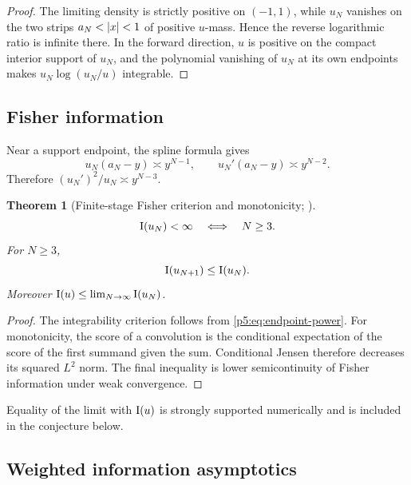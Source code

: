 \documentclass[11pt,oneside]{article}
\numberwithin{equation}{section}
\newtheorem{theorem}{Theorem}[section]
\theoremstyle{definition}
\theoremstyle{remark}
\begin{document}
\begin{proof}
The limiting density is strictly positive on $(-1,1)$, while $u_N$ vanishes on the two strips $a_N<\left\lvert x\right\rvert<1$ of positive $u$-mass.  Hence the reverse logarithmic ratio is infinite there.  In the forward direction, $u$ is positive on the compact interior support of $u_N$, and the polynomial vanishing of $u_N$ at its own endpoints makes $u_N\log(u_N/u)$ integrable.
\end{proof}

\subsection{Fisher information}

Near a support endpoint, the spline formula gives
\begin{equation}
 u_N(a_N-y)\asymp y^{N-1},
 \qquad
 u_N'(a_N-y)\asymp y^{N-2}.
 \label{p5:eq:endpoint-power}
\end{equation}
Therefore $(u_N')^2/u_N\asymp y^{N-3}$.

\begin{theorem}[Finite-stage Fisher criterion and monotonicity; \newresult]
\begin{equation}
 \operatorname{I}(u_N)<\infty\quad\Longleftrightarrow\quad N\ge3.
 \label{p5:eq:fisher-criterion}
\end{equation}
For $N\ge3$,
\begin{equation}
 \operatorname{I}(u_{N+1})\le\operatorname{I}(u_N).
 \label{p5:eq:fisher-monotone}
\end{equation}
Moreover $\operatorname{I}(u)\le\lim_{N\to\infty}\operatorname{I}(u_N)$.
\end{theorem}

\begin{proof}
The integrability criterion follows from \eqref{p5:eq:endpoint-power}.  For monotonicity, the score of a convolution is the conditional expectation of the score of the first summand given the sum.  Conditional Jensen therefore decreases its squared $L^2$ norm.  The final inequality is lower semicontinuity of Fisher information under weak convergence.
\end{proof}

Equality of the limit with $\operatorname{I}(u)$ is strongly supported numerically and is included in the conjecture below.

\subsection{Weighted information asymptotics}
\end{document}
